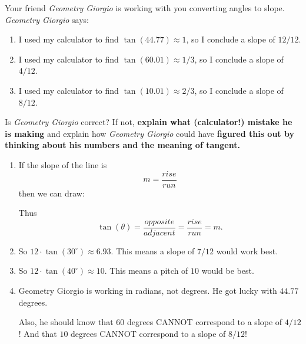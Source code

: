 \documentclass[noauthor,nooutcomes,hints,handout]{ximera}
\begin{document}
\begin{question}
 Your friend \textit{Geometry Giorgio} is working with you converting
 angles to slope.  \textit{Geometry Giorgio} says:
        \begin{enumerate}
        \item I used my calculator to find $\tan(44.77) \approx 1$, so I conclude a slope of $12/12$.
        \item I used my calculator to find $\tan(60.01) \approx 1/3$, so I conclude a slope of $4/12$.
        \item I used my calculator to find $\tan(10.01) \approx 2/3$, so I conclude a slope of $8/12$.
        \end{enumerate}
  Is \textit{Geometry Giorgio} correct? If not, \textbf{explain what (calculator!) mistake
    he is making} and explain how \textit{Geometry Giorgio} could have
  \textbf{figured this out by thinking about his numbers and the meaning of tangent.}
\begin{freeResponse}
  \begin{enumerate}
  \item If the slope of the line is
    \[
    m = \frac{rise}{run}
    \]
    then we can draw:
    \begin{center}
    \end{center}
    Thus
    \[
    \tan(\theta) =\frac{opposite}{adjacent} = \frac{rise}{run} = m.
    \]
  \item So $12\cdot \tan(30^\circ) \approx 6.93$. This means a slope
    of $7/12$ would work best.

  \item So $12\cdot \tan(40^\circ)\approx 10$. This means a pitch of
    $10$ would be best.
  \item Geometry Giorgio is working in radians, not degrees.
    He got lucky with $44.77$ degrees.

    Also, he should know that $60$ degrees CANNOT correspond to a
    slope of $4/12$! And  that $10$ degrees CANNOT correspond to a
    slope of $8/12$!
  \end{enumerate}
  \end{freeResponse}
\end{question}
\end{document}
